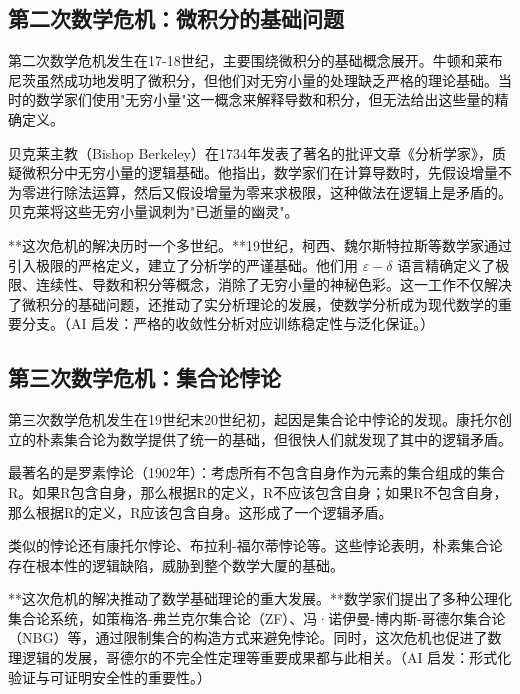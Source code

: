 \subsection{第二次数学危机：微积分的基础问题}


第二次数学危机发生在17-18世纪，主要围绕微积分的基础概念展开。牛顿和莱布尼茨虽然成功地发明了微积分，但他们对无穷小量的处理缺乏严格的理论基础。当时的数学家们使用"无穷小量"这一概念来解释导数和积分，但无法给出这些量的精确定义。

贝克莱主教（Bishop Berkeley）在1734年发表了著名的批评文章《分析学家》，质疑微积分中无穷小量的逻辑基础。他指出，数学家们在计算导数时，先假设增量不为零进行除法运算，然后又假设增量为零来求极限，这种做法在逻辑上是矛盾的。贝克莱将这些无穷小量讽刺为"已逝量的幽灵"。

**这次危机的解决历时一个多世纪。**19世纪，柯西、魏尔斯特拉斯等数学家通过引入极限的严格定义，建立了分析学的严谨基础。他们用 $\varepsilon-\delta$ 语言精确定义了极限、连续性、导数和积分等概念，消除了无穷小量的神秘色彩。这一工作不仅解决了微积分的基础问题，还推动了实分析理论的发展，使数学分析成为现代数学的重要分支。{（AI 启发：严格的收敛性分析对应训练稳定性与泛化保证。）}

\subsection{第三次数学危机：集合论悖论}


第三次数学危机发生在19世纪末20世纪初，起因是集合论中悖论的发现。康托尔创立的朴素集合论为数学提供了统一的基础，但很快人们就发现了其中的逻辑矛盾。

最著名的是罗素悖论（1902年）：考虑所有不包含自身作为元素的集合组成的集合R。如果R包含自身，那么根据R的定义，R不应该包含自身；如果R不包含自身，那么根据R的定义，R应该包含自身。这形成了一个逻辑矛盾。

类似的悖论还有康托尔悖论、布拉利-福尔蒂悖论等。这些悖论表明，朴素集合论存在根本性的逻辑缺陷，威胁到整个数学大厦的基础。

**这次危机的解决推动了数学基础理论的重大发展。**数学家们提出了多种公理化集合论系统，如策梅洛-弗兰克尔集合论（ZF）、冯·诺伊曼-博内斯-哥德尔集合论（NBG）等，通过限制集合的构造方式来避免悖论。同时，这次危机也促进了数理逻辑的发展，哥德尔的不完全性定理等重要成果都与此相关。{（AI 启发：形式化验证与可证明安全性的重要性。）}

